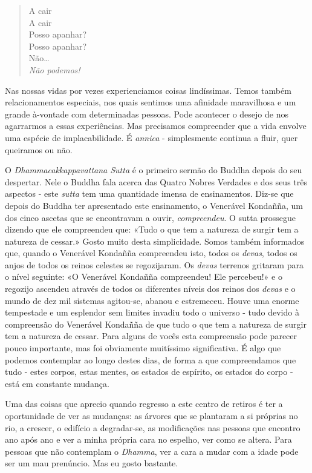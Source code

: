 \begin{quote}
  A cair\\
  A cair\\
  Posso apanhar?\\
  Posso apanhar?\\
  Não\ldots{}\\
  \emph{Não podemos!}
\end{quote}

Nas nossas vidas por vezes experienciamos coisas lindíssimas. Temos
também relacionamentos especiais, nos quais sentimos uma afinidade
maravilhosa e um grande à-vontade com determinadas pessoas. Pode
acontecer o desejo de nos agarrarmos a essas experiências. Mas
precisamos compreender que a vida envolve uma espécie de
implacabilidade. É \emph{annica} - simplesmente continua a fluir, quer
queiramos ou não.

O \emph{Dhammacakkappavattana Sutta} é o primeiro sermão do Buddha
depois do seu despertar. Nele o Buddha fala acerca das Quatro Nobres
Verdades e dos seus três aspectos - este \emph{sutta} tem uma quantidade
imensa de ensinamentos. Diz-se que depois do Buddha ter apresentado este
ensinamento, o Venerável Kondañña, um dos cinco ascetas que se
encontravam a ouvir, \emph{compreendeu}. O sutta prossegue dizendo que
ele compreendeu que: «Tudo o que tem a natureza de surgir tem a natureza
de cessar.» Gosto muito desta simplicidade. Somos também informados que,
quando o Venerável Kondañña compreendeu isto, todos os \emph{devas},
todos os anjos de todos os reinos celestes se regozijaram. Os
\emph{devas} terrenos gritaram para o nível seguinte: «O Venerável
Kondañña compreendeu! Ele percebeu!» e o regozijo ascendeu através de
todos os diferentes níveis dos reinos dos \emph{devas} e o mundo de dez
mil sistemas agitou-se, abanou e estremeceu. Houve uma enorme tempestade
e um esplendor sem limites invadiu todo o universo - tudo devido à
compreensão do Venerável Kondañña de que tudo o que tem a natureza de
surgir tem a natureza de cessar. Para alguns de vocês esta compreensão
pode parecer pouco importante, mas foi obviamente muitíssimo
significativa. É algo que podemos contemplar ao longo destes dias, de
forma a que compreendamos que tudo - estes corpos, estas mentes, os
estados de espírito, os estados do corpo - está em constante mudança.

Uma das coisas que aprecio quando regresso a este centro de retiros é
ter a oportunidade de ver as mudanças: as árvores que se plantaram a si
próprias no rio, a crescer, o edifício a degradar-se, as modificações
nas pessoas que encontro ano após ano e ver a minha própria cara no
espelho, ver como se altera. Para pessoas que não contemplam o
\emph{Dhamma}, ver a cara a mudar com a idade pode ser um mau prenúncio.
Mas eu gosto bastante.

